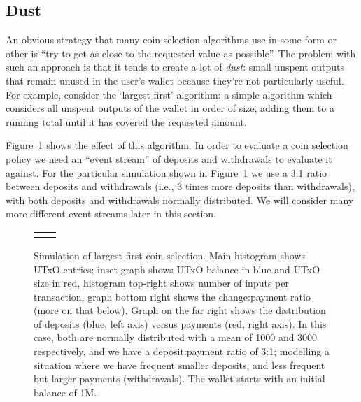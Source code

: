 \documentclass{article}
\theoremstyle{definition}{
  \newtheorem{lemma}{Lemma}[section] %
  \newtheorem{definition}[lemma]{Definition}
}
\theoremstyle{theorem}{
  \newtheorem{invariant}[lemma]{Invariant}
  \newtheorem{proofobligation}[lemma]{Proof Obligation}
}
\numberwithin{equation}{lemma}
\begin{document}
\subsection{Dust}

An obvious strategy that many coin selection algorithms use in some form or
other is ``try to get as close to the requested value as possible''. The problem
with such an approach is that it tends to create a lot of \emph{dust}: small
unspent outputs that remain unused in the user's wallet because they're not
particularly useful. For example, consider the `largest first' algorithm: a
simple algorithm which considers all unspent outputs of the wallet in order of
size, adding them to a running total until it has covered the requested amount.

Figure~\ref{fig:inputselection:normal_3to1_largest} shows the effect of this
algorithm. In order to evaluate a coin selection policy we need an ``event
stream'' of deposits and withdrawals to evaluate it against. For the particular
simulation shown in Figure~\ref{fig:inputselection:normal_3to1_largest} we use a
3:1 ratio between deposits and withdrawals (i.e., 3 times more deposits than
withdrawals), with both deposits and withdrawals normally distributed. We will
consider many more different event streams later in this section.

\begin{figure}[p]
\begin{center}
\scriptsize
\begin{tabular}{ll}
 &

\end{tabular}
\end{center}
\caption{\label{fig:inputselection:normal_3to1_largest}
  Simulation of largest-first coin selection. Main histogram shows UTxO entries;
  inset graph shows UTxO balance in blue and UTxO size in red, histogram
  top-right shows number of inputs per transaction, graph bottom right shows the
  change:payment ratio (more on that below). Graph on the far right shows the
  distribution of deposits (blue, left axis) versus payments (red, right axis).
  In this case, both are normally distributed with a mean of 1000 and 3000
  respectively, and we have a deposit:payment ratio of 3:1; modelling a
  situation where we have frequent smaller deposits, and less frequent but
  larger payments (withdrawals). The wallet starts with an initial balance of
  1M.
}
\end{figure}
\end{document}
